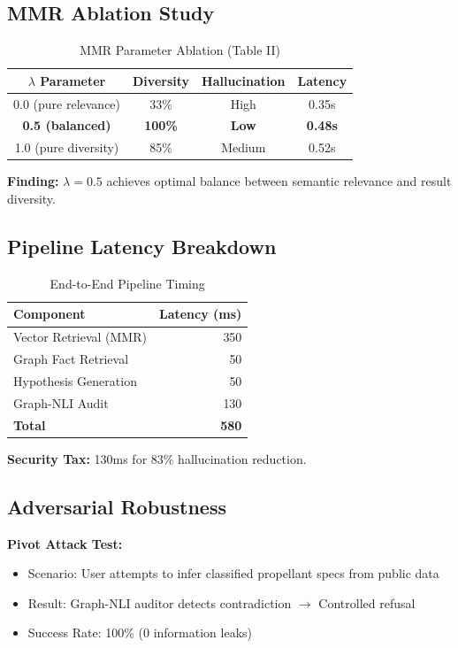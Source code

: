 \documentclass[journal,12pt,twocolumn]{IEEEtran}
\begin{document}
\subsection{MMR Ablation Study}

\begin{table}[h]
\centering
\caption{MMR Parameter Ablation (Table II)}
\begin{tabular}{|c|c|c|c|}
\hline
\textbf{$\lambda$ Parameter} & \textbf{Diversity} & \textbf{Hallucination} & \textbf{Latency} \\
\hline
0.0 (pure relevance) & 33\% & High & 0.35s \\
\hline
\textbf{0.5 (balanced)} & \textbf{100\%} & \textbf{Low} & \textbf{0.48s} \\
\hline
1.0 (pure diversity) & 85\% & Medium & 0.52s \\
\hline
\end{tabular}
\end{table}

\textbf{Finding:} $\lambda=0.5$ achieves optimal balance between semantic relevance and result diversity.

\subsection{Pipeline Latency Breakdown}

\begin{table}[h]
\centering
\caption{End-to-End Pipeline Timing}
\begin{tabular}{|l|r|}
\hline
\textbf{Component} & \textbf{Latency (ms)} \\
\hline
Vector Retrieval (MMR) & 350 \\
\hline
Graph Fact Retrieval & 50 \\
\hline
Hypothesis Generation & 50 \\
\hline
Graph-NLI Audit & 130 \\
\hline
\textbf{Total} & \textbf{580} \\
\hline
\end{tabular}
\end{table}

\textbf{Security Tax:} 130ms for 83\% hallucination reduction.

\subsection{Adversarial Robustness}

\textbf{Pivot Attack Test:}
\begin{itemize}
\item Scenario: User attempts to infer classified propellant specs from public data
\item Result: Graph-NLI auditor detects contradiction $\rightarrow$ Controlled refusal
\item Success Rate: 100\% (0 information leaks)
\end{itemize}
\end{document}
